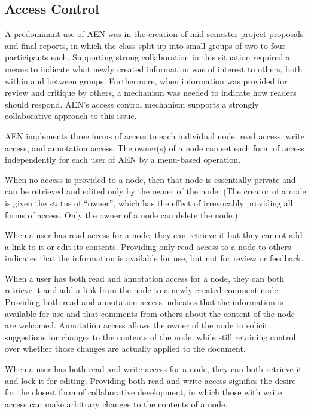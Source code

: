 \subsection{Access Control}

A predominant use of AEN was in the creation of mid-semester project
proposals and final reports, in which the class split up into small groups
of two to four participants each.  Supporting strong collaboration in this 
situation required a means to indicate what newly created information was
of interest to others, both within and between groups.  Furthermore, when 
information was provided for review and critique by others, a mechanism
was needed to indicate how readers should respond.  AEN's access control
mechanism supports a strongly collaborative approach to this issue.

AEN implements three forms of access to each individual node: read access,
write access, and annotation access. The owner(s) of a node can set each
form of access independently for each user of AEN by a menu-based
operation.

When no access is provided to a node, then that node is essentially
private and can be retrieved and edited only by the owner of the
node. (The creator of a node is given the status of ``owner'', which
has the effect of irrevocably providing all forms of access. Only the
owner of a node can delete the node.)

When a user has read access for a node, they can retrieve it but they
cannot add a link to it or edit its contents. Providing only read access to
a node to others indicates that the information is available for use, but
not for review or feedback.

When a user has both read and annotation access for a node, they can both
retrieve it and add a link from the node to a newly created comment
node. Providing both read and annotation access indicates that the
information is available for use and that comments from others about the
content of the node are welcomed.  Annotation access allows the owner of
the node to solicit suggestions for changes to the contents of the node,
while still retaining control over whether those changes are actually
applied to the document.

When a user has both read and write access for a node, they can both
retrieve it and lock it for editing.  Providing both read and write access
signifies the desire for the closest form of collaborative development, in
which those with write access can make arbitrary changes to the contents of
a node.


